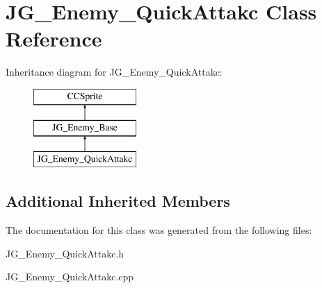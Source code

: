 \hypertarget{class_j_g___enemy___quick_attakc}{\section{J\-G\-\_\-\-Enemy\-\_\-\-Quick\-Attakc Class Reference}
\label{class_j_g___enemy___quick_attakc}
}
Inheritance diagram for J\-G\-\_\-\-Enemy\-\_\-\-Quick\-Attakc\-:\begin{figure}[H]
\begin{center}
\leavevmode
\includegraphics[height=3.000000cm]{class_j_g___enemy___quick_attakc}
\end{center}
\end{figure}
\subsection*{Additional Inherited Members}


The documentation for this class was generated from the following files\-:\begin{DoxyCompactItemize}
\item 
J\-G\-\_\-\-Enemy\-\_\-\-Quick\-Attakc.\-h\item 
J\-G\-\_\-\-Enemy\-\_\-\-Quick\-Attakc.\-cpp\end{DoxyCompactItemize}
